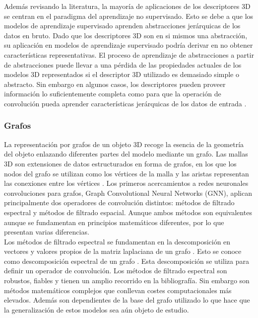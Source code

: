 Además revisando la literatura, la mayoría de aplicaciones de los descriptores 3D se centran en el paradigma del aprendizaje no supervisado. Esto se debe a que los modelos de aprendizaje supervisado aprenden abstracciones jerárquicas de los datos en bruto. Dado que los descriptores 3D son en si mismos una abstracción, su aplicación en modelos de aprendizaje supervisado podría derivar en no obtener características representativas. El proceso de aprendizaje de abstracciones a partir de abstracciones puede llevar a una pérdida de las propiedades actuales de los modelos 3D representados si el descriptor 3D utilizado es demasiado simple o abstracto. Sin embargo  en algunos casos, los descriptores pueden proveer información lo suficientemente completa como para que la operación de convolución pueda aprender características jerárquicas de los datos de entrada \cite{han2016mesh}.

\subsubsection{Grafos}
La representación por grafos de un objeto 3D recoge la esencia de la geometría del objeto enlazando diferentes partes del modelo mediante un grafo. Las mallas 3D son extensiones de datos estructurados en forma de grafos, en los que los nodos del grafo se utilizan como los vértices de la malla y las aristas representan las conexiones entre los vértices \cite{fey2018splinecnn}. Los primeros acercamientos a redes neuronales convoluciones para grafos, Graph Convolutional Neural Networks (GNN), aplican principalmente dos operadores de convolución distintos: métodos de filtrado espectral y métodos de filtrado espacial. Aunque ambos métodos son equivalentes aunque se fundamentan en principios matemáticos diferentes, por lo que presentan varias diferencias.\\

Los métodos de filtrado espectral se fundamentan en la descomposición en vectores y valores propios de la matriz laplaciana de un grafo \cite{flawnsontong2019}. Esto se conoce como descomposición espectral de un grafo \cite{hammond2011wavelets}. Esta descomposición se utiliza para definir un operador de convolución. Los métodos de filtrado espectral son robustos, fiables y tienen un amplio recorrido en la bibliografía. Sin embargo son métodos matemáticos complejos que conllevan costes computacionales más elevados. Además son dependientes de la base del grafo utilizado lo que hace que la generalización de estos modelos sea aún objeto de estudio.\\

